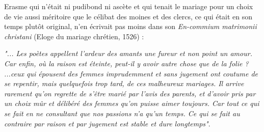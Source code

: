 Erasme qui n'était ni pudibond ni ascète et qui tenait le mariage pour un choix de vie aussi méritoire que le célibat des moines et des clercs, ce qui était en son temps plutôt original, n'en écrivait pas moins dans son \emph{En-commium matrimonii christani} (Eloge du mariage chrétien, 1526) : 

\begin{displayquote}
\emph{"... Les poètes appellent l'ardeur des amants une fureur et non point un amour. Car enfin, où la raison est éteinte, peut-il y avoir autre chose que de la folie ? ...ceux qui épousent des femmes imprudemment et sans jugement ont coutume de se repentir, mais quelquefois trop tard, de ces malheureux mariages. Il arrive rarement qu'on regrette de s'être marié par l'avis des parents, et d'avoir pris par un choix mûr et délibéré des femmes qu'on puisse aimer toujours. Car tout ce qui se fait en ne consultant que nos passions n'a qu'un temps. Ce qui se fait au contraire par raison et par jugement est stable et dure longtemps"}.  
\end{displayquote}

